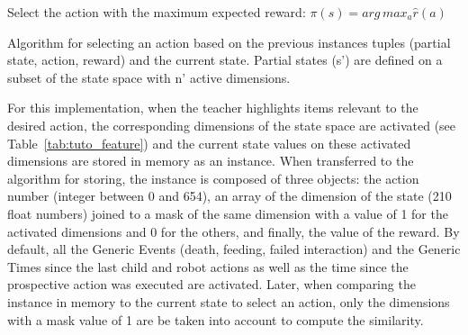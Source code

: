 \begin{algorithm}
	\DontPrintSemicolon
	Select the action with the maximum expected reward:
	$\pi(s) = arg\, max_{a} \hat{r}(a)$
	
	
	\caption{Algorithm for selecting an action based on the previous instances tuples (partial state, action, reward) and the current state. Partial states (s') are defined on a subset of the state space with n' active dimensions.}
	\label{algo:tuto}
\end{algorithm}

For this implementation, when the teacher highlights items relevant to the desired action, the corresponding dimensions of the state space are activated (see Table~\ref{tab:tuto_feature}) and the current state values on these activated dimensions are stored in memory as an instance.
When transferred to the algorithm for storing, the instance is composed of three objects: the action number (integer between 0 and 654), an array of the dimension of the state (210 float numbers) joined to a mask of the same dimension with a value of 1 for the activated dimensions and 0 for the others, and finally, the value of the reward. By default, all the Generic Events (death, feeding, failed interaction) and the Generic Times since the last child and robot actions as well as the time since the prospective action was executed are activated. Later, when comparing the instance in memory to the current state to select an action, only the dimensions with a mask value of 1 are be taken into account to compute the similarity.

